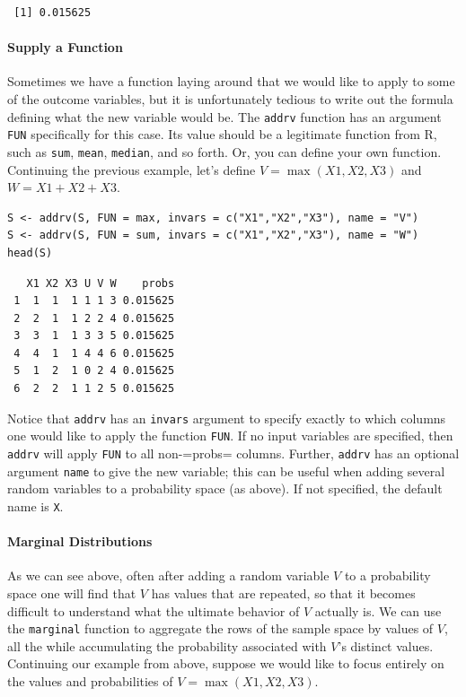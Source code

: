 \documentclass[captions=tableheading]{scrbook}
\begin{document}
\begin{verbatim}
 [1] 0.015625
\end{verbatim}

\paragraph*{Supply a Function}

Sometimes we have a function laying around that we would like to apply to some of the outcome variables, but it is unfortunately tedious to write out the formula defining what the new variable would be. The \texttt{addrv} function has an argument \texttt{FUN} specifically for this case. Its value should be a legitimate function from \textsf{R}, such as \texttt{sum}, \texttt{mean}, \texttt{median}, and so forth. Or, you can define your own function. Continuing the previous example, let's define \(V=\max(X1,X2,X3)\) and \(W=X1+X2+X3\). 


\begin{verbatim}
S <- addrv(S, FUN = max, invars = c("X1","X2","X3"), name = "V") 
S <- addrv(S, FUN = sum, invars = c("X1","X2","X3"), name = "W") 
head(S)
\end{verbatim}

\begin{verbatim}
   X1 X2 X3 U V W    probs
 1  1  1  1 1 1 3 0.015625
 2  2  1  1 2 2 4 0.015625
 3  3  1  1 3 3 5 0.015625
 4  4  1  1 4 4 6 0.015625
 5  1  2  1 0 2 4 0.015625
 6  2  2  1 1 2 5 0.015625
\end{verbatim}

Notice that \texttt{addrv} has an \texttt{invars} argument to specify exactly to which columns one would like to apply the function \texttt{FUN}. If no input variables are specified, then \texttt{addrv} will apply \texttt{FUN} to all non-=probs= columns. Further, \texttt{addrv} has an optional argument \texttt{name} to give the new variable; this can be useful when adding several random variables to a probability space (as above). If not specified, the default name is \texttt{X}.

\paragraph*{Marginal Distributions}

As we can see above, often after adding a random variable \(V\) to a probability space one will find that \(V\) has values that are repeated, so that it becomes difficult to understand what the ultimate behavior of \(V\) actually is. We can use the \texttt{marginal} function to aggregate the rows of the sample space by values of \(V\), all the while accumulating the probability associated with \(V\)'s distinct values. Continuing our example from above, suppose we would like to focus entirely on the values and probabilities of \(V=\max(X1,X2,X3)\). 
\end{document}
